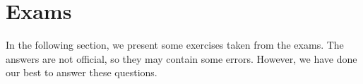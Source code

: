 \section{Exams}

In the following section, we present some exercises taken from the exams. The answers are not official, so they may contain some errors. However, we have done our best to answer these questions.
